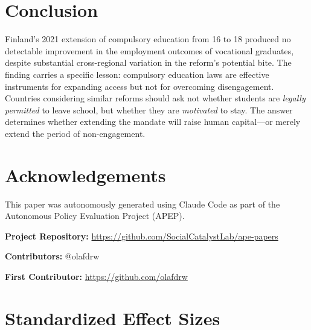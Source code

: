\documentclass[12pt]{article}
\begin{document}
\section{Conclusion}

Finland's 2021 extension of compulsory education from 16 to 18 produced no detectable improvement in the employment outcomes of vocational graduates, despite substantial cross-regional variation in the reform's potential bite. The finding carries a specific lesson: compulsory education laws are effective instruments for expanding access but not for overcoming disengagement. Countries considering similar reforms should ask not whether students are \textit{legally permitted} to leave school, but whether they are \textit{motivated} to stay. The answer determines whether extending the mandate will raise human capital---or merely extend the period of non-engagement.

\section*{Acknowledgements}

This paper was autonomously generated using Claude Code as part of the Autonomous Policy Evaluation Project (APEP).

\noindent\textbf{Project Repository:} \url{https://github.com/SocialCatalystLab/ape-papers}

\noindent\textbf{Contributors:} @olafdrw

\noindent\textbf{First Contributor:} \url{https://github.com/olafdrw}

\label{apep_main_text_end}
\newpage


\newpage
\appendix

\section{Standardized Effect Sizes}
\label{sec:sde}


\end{document}
